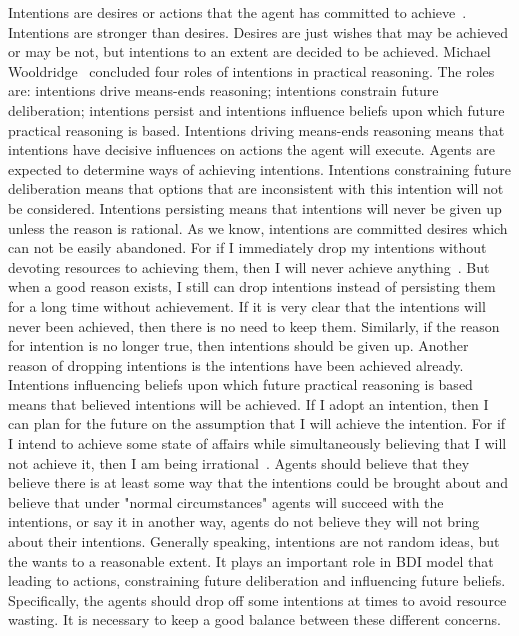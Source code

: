 Intentions are desires or actions that the agent has committed to achieve~\cite{Alejandro_LearnBDI_2004}. Intentions are stronger than desires. Desires are just wishes that may be achieved or may be not, but intentions to an extent are decided to be achieved. Michael Wooldridge~\cite{Gerhard_MultiSystem_1999} concluded four roles of intentions in practical reasoning. The roles are: intentions drive means-ends reasoning; intentions constrain future deliberation; intentions persist and intentions influence beliefs upon which future practical reasoning is based. Intentions driving means-ends reasoning means that intentions have decisive influences on actions the agent will execute. Agents are expected to determine ways of achieving intentions. Intentions constraining future deliberation means that options that are inconsistent with this intention will not be considered. Intentions persisting means that intentions will never be given up unless the reason is rational. As we know, intentions are committed desires which can not be easily abandoned. For if I immediately drop my intentions without devoting resources to achieving them, then I will never achieve anything~\cite{Gerhard_MultiSystem_1999}. But when a good reason exists, I still can drop intentions instead of persisting them for a long time without achievement. If it is very clear that the intentions will never been achieved, then there is no need to keep them. Similarly, if the reason for intention is no longer true, then intentions should be given up. Another reason of dropping intentions is the intentions have been achieved already. Intentions influencing beliefs upon which future practical reasoning is based means that believed intentions will be achieved. If I adopt an intention, then I can plan for the future on the assumption that I will achieve the intention. For if I intend to achieve some state of affairs while simultaneously believing that I will not achieve it, then I am being irrational~\cite{Gerhard_MultiSystem_1999}. Agents should believe that they believe there is at least some way that the intentions could be brought about and believe that under "normal circumstances" agents will succeed with the intentions, or say it in another way, agents do not believe they will not bring about their intentions. Generally speaking, intentions are not random ideas, but the wants to a reasonable extent. It plays an important role in BDI model that leading to actions, constraining future deliberation and influencing future beliefs. Specifically, the agents should drop off some intentions at times to avoid resource wasting. It is necessary to keep a good balance between these different concerns.


